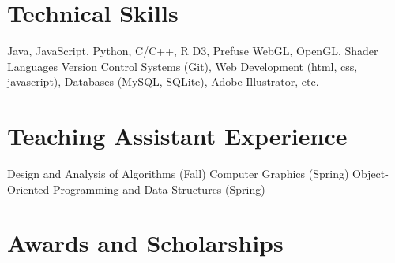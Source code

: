 \documentclass[11pt,a4paper,sans]{moderncv} %
\begin{document}





\section{Technical Skills}

 {Java, JavaScript, Python, C/C++, R}
 {D3, Prefuse}
 {WebGL, OpenGL, Shader Languages}
 {Version Control Systems (Git), Web Development (html, css, javascript), Databases (MySQL, SQLite), Adobe Illustrator, etc.}



\section{Teaching Assistant Experience}

 {Design and Analysis of Algorithms (Fall)}
 {Computer Graphics (Spring)}
 {Object-Oriented Programming and Data Structures (Spring)}



\section{Awards and Scholarships}

\end{document}
